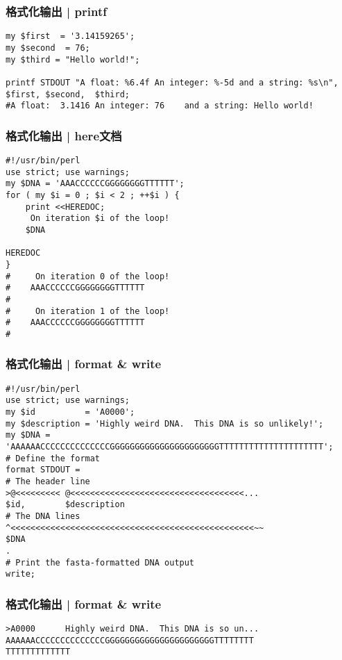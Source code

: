 \begin{frame}[fragile]
  \frametitle{格式化输出 | printf}
  \vspace{-1.5em}
\begin{lstlisting}
my $first  = '3.14159265';
my $second  = 76;
my $third = "Hello world!";

printf STDOUT "A float: %6.4f An integer: %-5d and a string: %s\n", $first, $second,  $third;
#A float:  3.1416 An integer: 76    and a string: Hello world!
\end{lstlisting}
\end{frame}

\begin{frame}[fragile]
  \frametitle{格式化输出 | here文档}
  \vspace{-1.5em}
\begin{lstlisting}
#!/usr/bin/perl
use strict; use warnings;
my $DNA = 'AAACCCCCCGGGGGGGGTTTTTT';
for ( my $i = 0 ; $i < 2 ; ++$i ) {
    print <<HEREDOC;
     On iteration $i of the loop!
    $DNA

HEREDOC
}
#     On iteration 0 of the loop!
#    AAACCCCCCGGGGGGGGTTTTTT
#
#     On iteration 1 of the loop!
#    AAACCCCCCGGGGGGGGTTTTTT
#
\end{lstlisting}
\end{frame}

\begin{frame}[fragile]
  \frametitle{格式化输出 | format \& write}
  \vspace{-1.5em}
\begin{lstlisting}[basicstyle=\footnotesize\tt,numberstyle=\scriptsize]
#!/usr/bin/perl
use strict; use warnings;
my $id          = 'A0000';
my $description = 'Highly weird DNA.  This DNA is so unlikely!';
my $DNA = 'AAAAAACCCCCCCCCCCCCCGGGGGGGGGGGGGGGGGGGGGGTTTTTTTTTTTTTTTTTTTTT';
# Define the format
format STDOUT =
# The header line
>@<<<<<<<<< @<<<<<<<<<<<<<<<<<<<<<<<<<<<<<<<<<<<...
$id,        $description
# The DNA lines
^<<<<<<<<<<<<<<<<<<<<<<<<<<<<<<<<<<<<<<<<<<<<<<<<<~~
$DNA
.
# Print the fasta-formatted DNA output
write;
\end{lstlisting}
\end{frame}

\begin{frame}[fragile]
  \frametitle{格式化输出 | format \& write}
  \vspace{-1.5em}
\begin{lstlisting}[basicstyle=\footnotesize\tt,numberstyle=\scriptsize]
>A0000      Highly weird DNA.  This DNA is so un...
AAAAAACCCCCCCCCCCCCCGGGGGGGGGGGGGGGGGGGGGGTTTTTTTT
TTTTTTTTTTTTT
\end{lstlisting}
\end{frame}

